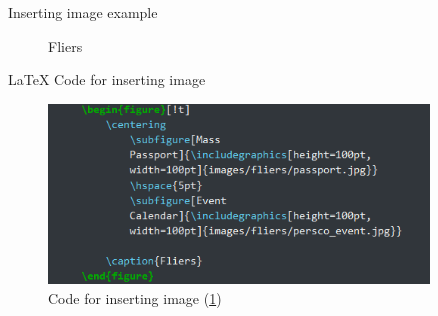 \documentclass{beamer}
\begin{document}
	\begin{frame}{Inserting image example}
		\begin{figure}[!t]
			\centering
				 \hspace{5pt}
			
			\caption{Fliers}
			\label{fig:figure1}
		\end{figure}
	\end{frame}
	\begin{frame}{LaTeX Code for inserting image}
		\begin{figure}
			\includegraphics[width=0.9\textwidth, height=0.6\textheight]{images/code/fliers_code.png}
			
			\caption{Code for inserting image (\ref{fig:figure1}) }
		\end{figure}
	\end{frame}
	
	
	
\end{document}
